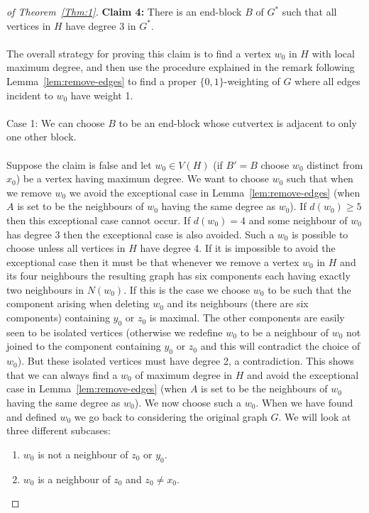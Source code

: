\documentclass[
final,
 nomarks,
]{dmtcs-episciences}
\theoremstyle{definition}
\begin{document}
\begin{proof}[of Theorem~\ref{Thm:1}]
\textbf{Claim 4:} There is an end-block $B$ of $G^*$ such that all vertices in $H$ have degree 3 in $G^*$. \\ \\
The overall strategy for proving this claim is to find a vertex $w_0$ in $H$ with local maximum degree, and then use the procedure explained in the remark following Lemma~\ref{lem:remove-edges} to find a proper $\{0,1\}$-weighting of $G$ where all edges incident to $w_0$ have weight 1. \\ \\
Case 1: We can choose $B$ to be an end-block whose cutvertex is adjacent to only one other block. 
\\ \\
Suppose the claim is false and let $w_0 \in V(H)$ (if $B'=B$ choose $w_0$ distinct from $x_0$) be a vertex having maximum degree. We want to choose $w_0$ such that when we remove $w_0$ we avoid the exceptional case in Lemma~\ref{lem:remove-edges} (when $A$ is set to be the neighbours of $w_0$ having the same degree as $w_0$). If $d(w_0) \geq 5$ then this exceptional case cannot occur. If $d(w_0)=4$ and some neighbour of $w_0$ has degree 3 then the exceptional case is also avoided. Such a $w_0$ is possible to choose unless all vertices in $H$ have degree 4. If it is impossible to avoid the exceptional case then it must be that whenever we remove a vertex $w_0$ in $H$ and its four neighbours the resulting graph has six components each having exactly two neighbours in $N(w_0)$. If this is the case we choose $w_0$ to be such that the component arising when deleting $w_0$ and its neighbours (there are six components) containing $y_0$ or $z_0$ is maximal. The other components are easily seen to be isolated vertices (otherwise we redefine $w_0$ to be a neighbour of $w_0$ not joined to the component containing $y_0$ or $z_0$ and this will contradict the choice of $w_0$). But these isolated vertices must have degree 2, a contradiction. This shows that we can always find a $w_0$ of maximum degree in $H$ and avoid the exceptional case in Lemma~\ref{lem:remove-edges} (when $A$ is set to be the neighbours of $w_0$ having the same degree as $w_0$). We now choose such a $w_0$. When we have found and defined $w_0$ we go back to considering the original graph $G$. We will look at three different subcases: 
\begin{enumerate}
\item $w_0$ is not a neighbour of $z_0$ or $y_0$.
\item $w_0$ is a neighbour of $z_0$ and $z_0 \neq x_0$.

\end{enumerate}
\end{proof}
\end{document}
